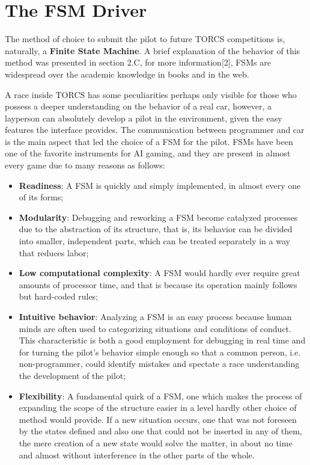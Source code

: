 \section{The FSM Driver}

	The method of choice to submit the pilot to future TORCS competitions is, naturally, a \textbf{Finite State Machine}. A brief explanation of the behavior of this method was presented in section 2.C, for more information[2], FSMs are widespread over the academic knowledge in books and in the web.
	
	A race inside TORCS has some peculiarities perhaps only visible for those who possess a deeper understanding on the behavior of a real car, however, a layperson can absolutely develop a pilot in the environment, given the easy features the interface provides. The communication between programmer and car is the main aspect that led the choice of a FSM for the pilot. FSMs have been one of the favorite instruments for AI gaming, and they are present in almost every game due to many reasons as follows:

\begin{itemize}
	\item \textbf{Readiness}: A FSM is quickly and simply implemented, in almost every one of its forms;
	
	\item \textbf{Modularity}: Debugging and reworking a FSM become catalyzed processes due to the abstraction of its structure, that is, its behavior can be divided into smaller, independent parts, which can be treated separately in a way that reduces labor;
	
	\item \textbf{Low computational complexity}: A FSM would hardly ever require great amounts of processor time, and that is because its operation mainly follows but hard-coded rules;
	
	\item \textbf{Intuitive behavior}: Analyzing a FSM is an easy process because human minds are often used to categorizing situations and conditions of conduct. This characteristic is both a good employment for debugging in real time and for turning the pilot's behavior simple enough so that a common person, i.e. non-programmer, could identify mistakes and spectate a race understanding the development of the pilot;
	
	\item \textbf{Flexibility}: A fundamental quirk of a FSM, one which makes the process of expanding the scope of the structure easier in a level hardly other choice of method would provide. If a new situation occurs, one that was not foreseen by the states defined and also one that could not be inserted in any of them, the mere creation of a new state would solve the matter, in about no time and almost without interference in the other parts of the whole.
\end{itemize}

